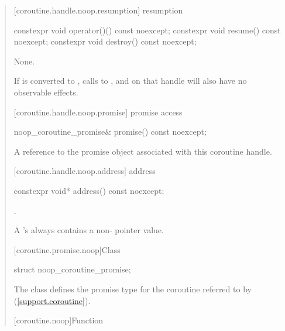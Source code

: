 \begin{quote}
[coroutine.handle.noop.resumption]{ resumption}
\begin{itemdecl}
  constexpr void operator()() const noexcept;
  constexpr void resume() const noexcept;
  constexpr void destroy() const noexcept;
\end{itemdecl}

\begin{itemdescr}
  \pnum
  \effects None.
  
  \pnum
  \remarks If  is converted to , calls to ,  and  on that handle will also have no observable effects.
\end{itemdescr}

[coroutine.handle.noop.promise]{ promise access}
\begin{itemdecl}
  noop_coroutine_promise& promise() const noexcept;
\end{itemdecl}

\begin{itemdescr}
  \pnum
  \returns A reference to the promise object associated with this coroutine handle.
\end{itemdescr}

[coroutine.handle.noop.address]{ address}
\begin{itemdecl}
  constexpr void* address() const noexcept;
\end{itemdecl}

\begin{itemdescr}
  \pnum
  \returns {}.

  \pnum
  \remarks A 's  always contains a non- pointer value.
\end{itemdescr}

[coroutine.promise.noop]{Class }
\begin{itemdecl}
  struct noop_coroutine_promise{};
\end{itemdecl}

\begin{itemdescr}
  \pnum The class  defines the promise type for the coroutine referred to by  (\ref{support.coroutine}).
\end{itemdescr}

[coroutine.noop]{Function }


\end{quote}
